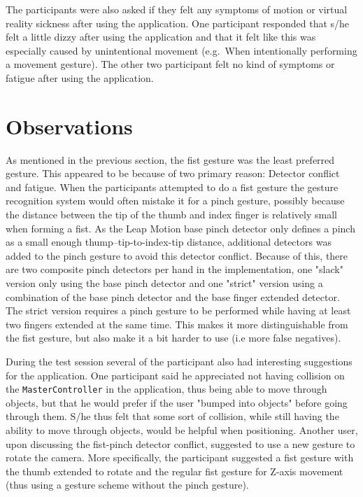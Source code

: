The participants were also asked if they felt any symptoms of motion or virtual reality sickness after using the application. 
One participant responded that s/he felt a little dizzy after using the application and that it felt like this was especially caused by unintentional movement 
(e.g.~When intentionally performing a movement gesture). The other two participant felt no kind of symptoms or fatigue after using the application.

\section{Observations}
As mentioned in the previous section, the fist gesture was the least preferred gesture.
This appeared to be because of two primary reason: Detector conflict and fatigue.
When the participants attempted to do a fist gesture the gesture recognition system would often mistake it for a pinch gesture,
possibly because the distance between the tip of the thumb and index finger is relatively small when forming a fist. As the Leap Motion base pinch detector only defines a pinch
as a small enough thump--tip-to-index-tip distance, additional detectors was added to the pinch gesture to avoid this detector conflict. 
Because of this, there are two composite pinch
detectors per hand in the implementation, one "slack" version only using the base pinch detector and one "strict" version using a combination of the base
pinch detector and the base finger extended detector. The strict version requires a pinch gesture to be performed while having at least two fingers extended at the same time. 
This makes it more distinguishable from the fist gesture, but also make it a bit harder to use (i.e more false negatives).


During the test session several of the participant also had interesting suggestions for the application.
One participant said he appreciated not having collision on the \texttt{MasterController} in the application, thus being able to move through objects, 
but that he would prefer if the user "bumped into objects" before going through them. S/he thus felt that some sort of collision, while still having the ability to move
through objects, would be helpful when positioning. 
Another user, upon discussing the fist-pinch detector conflict, suggested to use a new gesture to rotate the camera. 
More specifically, the participant suggested a fist gesture with the thumb extended to rotate and the regular fist gesture for Z-axis movement (thus using a gesture
scheme without the pinch gesture).


